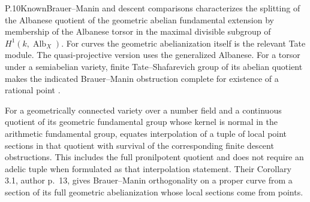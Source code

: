 \begin{result}{P.10}{Known}{Brauer--Manin and descent comparisons}
\citet[Theorem 1.2, corrected author pp.~2--3; Remark 2.4, p.~7]{LitHarariSzamuely2009}
characterizes the splitting of the Albanese quotient of the geometric
abelian fundamental extension by membership of the Albanese torsor in
the maximal divisible subgroup of \(H^1(k,\operatorname{Alb}_X)\).
For curves the geometric abelianization itself is the relevant Tate
module. The quasi-projective version uses the generalized Albanese.
For a torsor under a semiabelian variety, finite Tate--Shafarevich group
of its abelian quotient makes the indicated Brauer--Manin obstruction
complete for existence of a rational point
\citep[Theorem 1.1, author p.~2; Corollary 4.8 and Lemma 4.9,
author p.~16]{LitHarariSzamuely2008}.

For a geometrically connected variety over a number field and a continuous
quotient of its geometric fundamental group whose kernel is normal in the
arithmetic fundamental group,
\citet[Theorem 2.1 and Remark (3), author pp.~11--12]{LitHarariStix2012}
equates interpolation of a tuple of local point sections in that quotient
with survival of the corresponding finite descent obstructions.
This includes the full pronilpotent quotient and does not require an
adelic tuple when formulated as that interpolation statement.
Their Corollary 3.1, author p.~13, gives Brauer--Manin orthogonality
on a proper curve from a section of its full geometric abelianization
whose local sections come from points.
\end{result}
